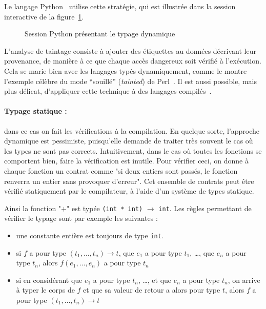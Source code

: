 Le langage Python~ utilise cette stratégie, qui est illustrée dans
la session interactive de la figure~\ref{fig:typage-dynamique}.

\begin{figure}
  \caption{Session Python présentant le typage dynamique}
  \label{fig:typage-dynamique}
\end{figure}

L'analyse de taintage consiste à ajouter des étiquettes au données décrivant
leur provenance, de manière à ce que chaque accès dangereux soit vérifié à
l'exécution. Cela se marie bien avec les langages typés dynamiquement, comme le
montre l'exemple célèbre du mode ``souillé'' (\emph{tainted}) de
Perl~\cite{perlCamelBook}. Il est aussi possible, mais plus délicat, d'appliquer
cette technique à des langages compilés~\cite{clause-etal-issta07,oakland10}.

\paragraph{Typage statique :} dans ce cas on fait les vérifications à la
compilation. En quelque sorte, l'approche dynamique est pessimiste, puisqu'elle
demande de traiter très souvent le cas où les types ne sont pas corrects.
Intuitivement, dans le cas où toutes les fonctions se comportent bien, faire la
vérification est inutile. Pour vérifier ceci, on donne à chaque fonction un
contrat comme "si deux entiers sont passés, le fonction renverra un entier sans
provoquer d'erreur". Cet ensemble de contrats peut être vérifié statiquement par
le compilateur, à l'aide d'un système de types statique.

Ainsi la fonction "$+$" est typée \texttt{(int * int)} $→$ \texttt{int}. Les
règles permettant de vérifier le typage sont par exemple les suivantes :

\begin{itemize}
\item
  une constante entière est toujours de type \texttt{int}.
\item
  si $f$ a pour type $(t_1, …, t_n) → t$, que $e_1$ a pour type $t_1$,
  \ldots{}, que $e_n$ a pour type $t_n$, alors $f(e_1, …, e_n)$ a pour
  type $t_n$
\item
  si en considérant que $e_1$ a pour type $t_n$, …, et que $e_n$ a pour type
  $t_n$, on arrive à typer le corps de $f$ et que sa valeur de retour a alors
  pour type $t$,
  alors $f$ a pour type $(t_1, …, t_n) → t$
\end{itemize}

